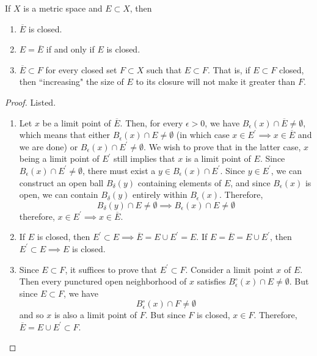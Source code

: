 \documentclass{article}
\begin{document}
    \begin{theorem}
      If $X$ is a metric space and $E \subset X$, then 
      \begin{enumerate}
        \item $\overline{E}$ is closed. 
        \item $E = \overline{E}$ if and only if $E$ is closed. 
        \item $\overline{E} \subset F$ for every closed set $F \subset X$ such that $E \subset F$. That is, if $E \subset F$ closed, then ``increasing" the size of $E$ to its closure will not make it greater than $F$. 
      \end{enumerate}
    \end{theorem}
    \begin{proof}
      Listed. 
      \begin{enumerate}
        \item Let $x$ be a limit point of $\overline{E}$. Then, for every $\epsilon > 0$, we have $B_\epsilon (x) \cap \overline{E} \neq \emptyset$, which means that either $B_\epsilon (x) \cap E \neq \emptyset$ (in which case $x \in E^\prime \implies x \in \overline{E}$ and we are done) or $B_\epsilon (x) \cap E^\prime \neq \emptyset$. We wish to prove that in the latter case, $x$ being a limit point of $E^\prime$ still implies that $x$ is a limit point of $E$. Since $B_\epsilon (x) \cap E^\prime \neq \emptyset$, there must exist a $y \in B_\epsilon (x) \cap E^\prime$. Since $y \in E^\prime$, we can construct an open ball $B_\delta (y)$ containing elements of $E$, and since $B_\epsilon (x)$ is open, we can contain $B_\delta (y)$ entirely within $B_\epsilon (x)$. Therefore, 
        \[B_\delta (y) \cap E \neq \emptyset \implies B_\epsilon (x) \cap E \neq \emptyset\]
        therefore, $x \in E^\prime \implies x \in \overline{E}$. 

        \item If $E$ is closed, then $E^\prime \subset E \implies \overline{E} = E \cup E^\prime = E$. If $E = \overline{E} = E \cup E^\prime$, then $E^\prime \subset E \implies E$ is closed. 

        \item Since $E \subset F$, it suffices to prove that $E^\prime \subset F$. Consider a limit point $x$ of $E$. Then every punctured open neighborhood of $x$ satisfies $B_\epsilon^\circ (x) \cap E \neq \emptyset$. But since $E \subset F$, we have 
        \[B_\epsilon^\circ (x) \cap F \neq \emptyset\]
        and so $x$ is also a limit point of $F$. But since $F$ is closed, $x \in F$. Therefore, $\overline{E} = E \cup E^\prime \subset F$. 
      \end{enumerate}
    \end{proof}
\end{document}
